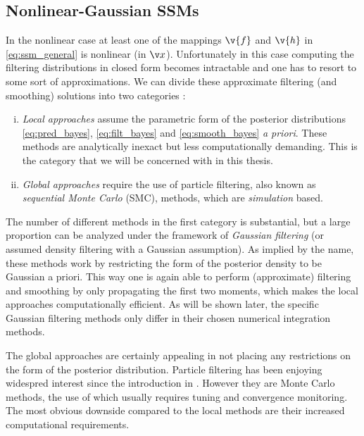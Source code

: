 \subsection{Nonlinear-Gaussian SSMs}%
\label{sec:nonlinear_state}
In the nonlinear case at least one of the mappings $\v{f}$ and $\v{h}$ in
\eqref{eq:ssm_general} is nonlinear (in $\x$). Unfortunately in this case computing the filtering
distributions in closed form becomes intractable and one has to resort to 
some sort of approximations. We can
divide these approximate filtering (and smoothing) solutions into two 
categories \parencite[see, e.g.,][]{Arasaratnam2009}: 
\begin{enumerate}[i)] \addtolength{\leftskip}{.5cm} \itemsep1pt \parskip0pt 
  \item \emph{Local approaches} assume the parametric form of the posterior
  distributions \eqref{eq:pred_bayes}, \eqref{eq:filt_bayes} and \eqref{eq:smooth_bayes} \emph{a priori}. 
  These  methods are analytically inexact but less computationally demanding. This is the category that
we will be concerned with in this thesis. 
  \item \emph{Global approaches} require the use of particle filtering, also known as 
  \emph{sequential Monte Carlo} (SMC), 
  methods, which are \emph{simulation} based.
\end{enumerate}%
%
The number of different methods in the first category is substantial,
but a large proportion can be analyzed under the framework of
\emph{Gaussian filtering} (or assumed density filtering
with a Gaussian assumption). As implied by the name, these
methods work by restricting the form of the posterior density to be Gaussian
a priori. This way one is again able to perform (approximate) filtering and smoothing
by only propagating the first two moments, which makes the local approaches
computationally efficient.  As will be shown later, the specific Gaussian filtering 
methods only differ in their chosen numerical integration methods.

The global approaches are certainly appealing in not placing
any restrictions on the form of the posterior distribution. Particle filtering
has been enjoying widespred interest since the introduction 
in \textcite{Gordon1993} \parencite[see also][]{Cappe2007,Kantas2009,Cappe2005}. However they
are Monte Carlo methods, the use of which usually requires tuning
and convergence monitoring. The most obvious downside compared to
the local methods are their increased computational requirements. 

